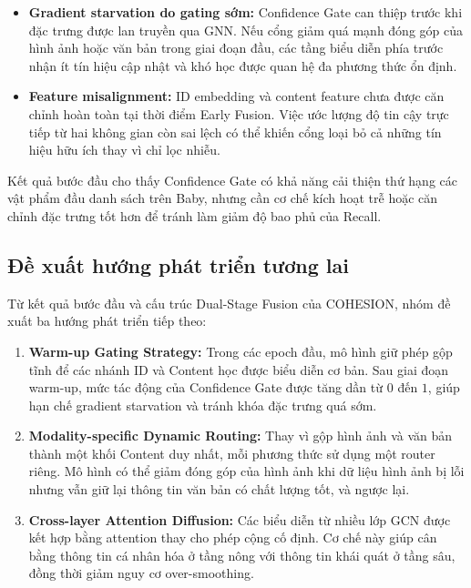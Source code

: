 \begin{itemize}[leftmargin=*,labelsep=6pt]
    \item \textbf{Gradient starvation do gating sớm:} Confidence Gate can thiệp trước khi đặc trưng được lan truyền qua GNN. Nếu cổng giảm quá mạnh đóng góp của hình ảnh hoặc văn bản trong giai đoạn đầu, các tầng biểu diễn phía trước nhận ít tín hiệu cập nhật và khó học được quan hệ đa phương thức ổn định.
    \item \textbf{Feature misalignment:} ID embedding và content feature chưa được căn chỉnh hoàn toàn tại thời điểm Early Fusion. Việc ước lượng độ tin cậy trực tiếp từ hai không gian còn sai lệch có thể khiến cổng loại bỏ cả những tín hiệu hữu ích thay vì chỉ lọc nhiễu.
\end{itemize}

Kết quả bước đầu cho thấy Confidence Gate có khả năng cải thiện thứ hạng các vật phẩm đầu danh sách trên Baby, nhưng cần cơ chế kích hoạt trễ hoặc căn chỉnh đặc trưng tốt hơn để tránh làm giảm độ bao phủ của Recall.

\subsection{Đề xuất hướng phát triển tương lai}

Từ kết quả bước đầu và cấu trúc Dual-Stage Fusion của COHESION, nhóm đề xuất ba hướng phát triển tiếp theo:

\begin{enumerate}[leftmargin=*,label=\textbf{Hướng \arabic*.}]
    \item \textbf{Warm-up Gating Strategy:}
    Trong các epoch đầu, mô hình giữ phép gộp tĩnh để các nhánh ID và Content học được biểu diễn cơ bản. Sau giai đoạn warm-up, mức tác động của Confidence Gate được tăng dần từ $0$ đến $1$, giúp hạn chế gradient starvation và tránh khóa đặc trưng quá sớm.

    \item \textbf{Modality-specific Dynamic Routing:}
    Thay vì gộp hình ảnh và văn bản thành một khối Content duy nhất, mỗi phương thức sử dụng một router riêng. Mô hình có thể giảm đóng góp của hình ảnh khi dữ liệu hình ảnh bị lỗi nhưng vẫn giữ lại thông tin văn bản có chất lượng tốt, và ngược lại.

    \item \textbf{Cross-layer Attention Diffusion:}
    Các biểu diễn từ nhiều lớp GCN được kết hợp bằng attention thay cho phép cộng cố định. Cơ chế này giúp cân bằng thông tin cá nhân hóa ở tầng nông với thông tin khái quát ở tầng sâu, đồng thời giảm nguy cơ over-smoothing.
\end{enumerate}

\clearpage